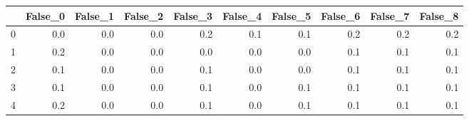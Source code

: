 \begin{tabular}{lrrrrrrrrr}
\toprule
{} &  False\_0 &  False\_1 &  False\_2 &  False\_3 &  False\_4 &  False\_5 &  False\_6 &  False\_7 &  False\_8 \\ \hline
\midrule
0 &      0.0 &      0.0 &      0.0 &      0.2 &      0.1 &      0.1 &      0.2 &      0.2 &      0.2 \\ \hline
1 &      0.2 &      0.0 &      0.0 &      0.0 &      0.0 &      0.0 &      0.1 &      0.1 &      0.1 \\ \hline
2 &      0.1 &      0.0 &      0.0 &      0.1 &      0.0 &      0.0 &      0.1 &      0.1 &      0.1 \\ \hline
3 &      0.1 &      0.0 &      0.0 &      0.1 &      0.0 &      0.1 &      0.1 &      0.1 &      0.1 \\ \hline
4 &      0.2 &      0.0 &      0.0 &      0.1 &      0.0 &      0.1 &      0.1 &      0.1 &      0.1 \\ \hline
\bottomrule
\end{tabular}

